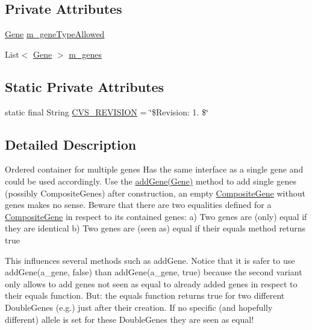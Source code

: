 \subsection*{Private Attributes}
\begin{DoxyCompactItemize}
\item 
\hyperlink{interfaceorg_1_1jgap_1_1_gene}{Gene} \hyperlink{classorg_1_1jgap_1_1impl_1_1_composite_gene_a490eb7a6c703d4f20bbbe4d25b78eea3}{m\-\_\-gene\-Type\-Allowed}
\item 
List$<$ \hyperlink{interfaceorg_1_1jgap_1_1_gene}{Gene} $>$ \hyperlink{classorg_1_1jgap_1_1impl_1_1_composite_gene_a20eb52e3e6e1966527dd8a7282660b2c}{m\-\_\-genes}
\end{DoxyCompactItemize}
\subsection*{Static Private Attributes}
\begin{DoxyCompactItemize}
\item 
static final String \hyperlink{classorg_1_1jgap_1_1impl_1_1_composite_gene_a9a4802f5b06ad58a96f1a40b60f836c6}{C\-V\-S\-\_\-\-R\-E\-V\-I\-S\-I\-O\-N} = \char`\"{}\$Revision\-: 1. \$\char`\"{}
\end{DoxyCompactItemize}


\subsection{Detailed Description}
Ordered container for multiple genes Has the same interface as a single gene and could be used accordingly. Use the \hyperlink{interfaceorg_1_1jgap_1_1_i_composite_gene_a28fc3a076dc6983c39108dc10751596d}{add\-Gene(\-Gene)} method to add single genes (possibly Composite\-Genes) after construction, an empty \hyperlink{classorg_1_1jgap_1_1impl_1_1_composite_gene}{Composite\-Gene} without genes makes no sense. Beware that there are two equalities defined for a \hyperlink{classorg_1_1jgap_1_1impl_1_1_composite_gene}{Composite\-Gene} in respect to its contained genes\-: a) Two genes are (only) equal if they are identical b) Two genes are (seen as) equal if their equals method returns true

This influences several methods such as add\-Gene. Notice that it is safer to use add\-Gene(a\-\_\-gene, false) than add\-Gene(a\-\_\-gene, true) because the second variant only allows to add genes not seen as equal to already added genes in respect to their equals function. But\-: the equals function returns true for two different Double\-Genes (e.\-g.) just after their creation. If no specific (and hopefully different) allele is set for these Double\-Genes they are seen as equal!

